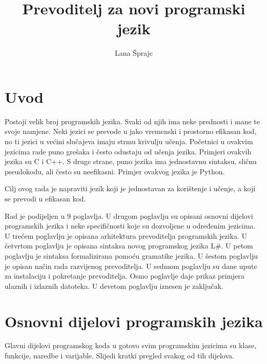 \documentclass[times, utf8, zavrsni]{fer}
\begin{document}

\title{Prevoditelj za novi programski jezik}

\author{Lana Šprajc}

\maketitle


\zahvala{}

\tableofcontents

\chapter{Uvod}
Postoji velik broj programskih jezika. Svaki od njih ima neke prednosti i mane te svoje namjene.
Neki jezici se prevode u jako vremenski i prostorno efikasan kod, no ti jezici u većini slučajeva imaju strmu krivulju učenja. Početnici u ovakvim jezicima
rade puno grešaka i često odustaju od učenja jezika. Primjeri ovakvih jezika su C i C++. S druge strane, puno jezika ima jednostavnu sintaksu, sličnu pseudokodu, ali
često su neefikasni. Primjer ovakvog jezika je Python.

Cilj ovog rada je napraviti jezik koji je jednostavan za korištenje i učenje, a koji se prevodi u efikasan kod.

Rad je podijeljen u 9 poglavlja. U drugom poglavlju su opisani osnovni dijelovi programskih jezika i neke specifičnosti koje su dozvoljene u određenim jezicima.
U trećem poglavlju je opisana arhitektura prevoditelja programskih jezika. U četvrtom poglavlju je opisana sintaksa novog programskog jezika L\#. U petom poglavlju
je sintaksa formalizirana pomoću gramatike jezika. U šestom poglavlju je opisan način rada razvijenog prevoditelja. U sedmom poglavlju su dane upute za instalaciju
i pokretanje prevoditelja. Osmo poglavlje daje prikaz primjera ulaznih i izlaznih datoteka. U devetom poglavlju iznesen je zaključak.

\chapter{Osnovni dijelovi programskih jezika}
Glavni dijelovi programskog koda u gotovo svim programskim jezicima su klase, funkcije, naredbe i varijable. Slijedi kratki pregled svakog od tih dijelova.
\end{document}
